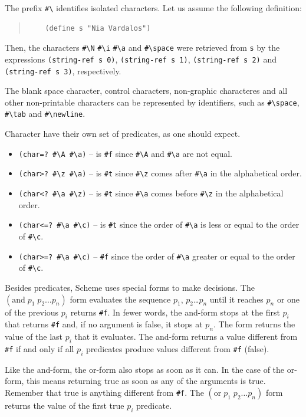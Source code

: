 \documentclass[a4paper,12pt]{book}
\begin{document}
The prefix \verb|#\| identifies isolated
characters. Let us assume the following
definition:
\begin{quote}
	\begin{verbatim}
	(define s "Nia Vardalos")
	\end{verbatim}
\end{quote}
Then, the characters
\verb|#\N| \verb|#\i| 
\verb|#\a| and \verb|#\space|
were retrieved from
\verb|s| by the
expressions \verb|(string-ref s 0)|,
\verb|(string-ref s 1)|,
\verb|(string-ref s 2)| and
\verb|(string-ref s 3)|,
\verb|| respectively.

The blank space character,  control
characters, non-graphic characteres
and all other non-printable characters
can be represented by
identifiers, such as \verb|#\space|,
\verb|#\tab| and \verb|#\newline|.

Character have their own set of
predicates, as one should expect.
\begin{itemize}
	\item\verb|(char=? #\A #\a)| -- is \verb|#f|
		since \verb|#\A| and \verb|#\a| are not equal.
	\item\verb|(char>? #\z #\a)| -- is \verb|#t|
		since \verb|#\z|  comes
		after \verb|#\a| in the alphabetical order.
	\item\verb|(char<? #\a #\z)| -- is \verb|#t|
		since \verb|#\a| comes before \verb|#\z|
		in the alphabetical order.
	\item\verb|(char<=? #\a #\c)| -- is \verb|#t| since
		the order of \verb|#\a| is less or equal to
		the order of \verb|#\c|.
	\item\verb|(char>=? #\a #\c)| -- \verb|#f| since
		the order of \verb|#\a| greater or equal to the
		order of \verb|#\c|.
\end{itemize}

Besides predicates, Scheme uses special forms
to make decisions. The $(\textrm{and}\; p_1\;
p_2\ldots p_n)$ form
evaluates the sequence $p_1$, $p_2$\ldots $p_n$
until it reaches $p_n$ or one of the previous
$p_i$ returns \verb|#f|. In fewer words,
the and-form stops at the first
$p_i$ that returns \verb|#f| and, if no
argument is false, it stops at $p_n$.
The form returns the value of the last
$p_i$ that it evaluates. The and-form
returns a value different from \verb|#f|
if and only if all $p_i$ predicates produce
values different from \verb|#f| (false).

Like the and-form, the or-form also stops
as soon as it can. In the case of the or-form,
this means returning true as soon as any
of the arguments is true. Remember that
true is anything different from \verb|#f|.
The  $(\textrm{or}\; p_1\;
p_2\ldots p_n)$ form returns the value
of the first true $p_i$ predicate.
\end{document}
